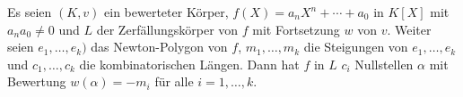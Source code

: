 \begin{Prop}
	Es seien $(K,v)$ ein bewerteter Körper, $f(X)=a_nX^n+ \cdots + a_0$ in $K[X]$ mit $a_n a_0 \neq 0$
	und $L$ der Zerfällungskörper von $f$ mit Fortsetzung $w$ von $v$. Weiter seien $e_1, \dots, e_k)$ das Newton-Polygon von $f$, $m_1,\dots,m_k$ die Steigungen von $e_1, \dots, e_k$ und $c_1,\dots, c_k$ die kombinatorischen Längen. Dann hat $f$ in $L$ $c_i$ Nullstellen $\alpha$ mit Bewertung 
	$w(\alpha) = -m_i$ für alle $i=1, \dots, k$.
\end{Prop}





